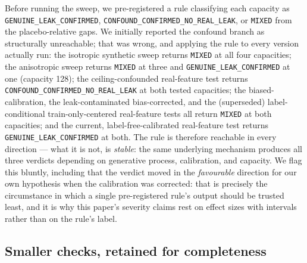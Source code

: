 \documentclass[10pt]{article} %
\begin{document}
Before running the sweep, we pre-registered a rule classifying each capacity as
\texttt{GENUINE\_LEAK\_CONFIRMED}, \texttt{CONFOUND\_CONFIRMED\_NO\_REAL\_LEAK},
or \texttt{MIXED} from the placebo-relative gaps. We initially reported the
confound branch as structurally unreachable; that was wrong, and applying the
rule to every version actually run: the isotropic synthetic sweep returns
\texttt{MIXED} at all four capacities; the anisotropic sweep returns
\texttt{MIXED} at three and \texttt{GENUINE\_LEAK\_CONFIRMED} at one (capacity
128); the ceiling-confounded real-feature test returns
\texttt{CONFOUND\_CONFIRMED\_NO\_REAL\_LEAK} at both tested capacities; the
biased-calibration, the leak-contaminated bias-corrected, and the (superseded)
label-conditional train-only-centered real-feature tests all return
\texttt{MIXED} at both capacities; and the current, label-free-calibrated
real-feature test returns \texttt{GENUINE\_LEAK\_CONFIRMED} at both. The rule
is therefore reachable in every direction --- what it is not, is \emph{stable}:
the same underlying mechanism produces all three verdicts depending on
generative process, calibration, and capacity. We flag this bluntly, including
that the verdict moved in the \emph{favourable} direction for our own
hypothesis when the calibration was corrected: that is precisely the
circumstance in which a single pre-registered rule's output should be trusted
least, and it is why this paper's severity claims rest on effect sizes with
intervals rather than on the rule's label.

\subsection{Smaller checks, retained for completeness}
\end{document}
